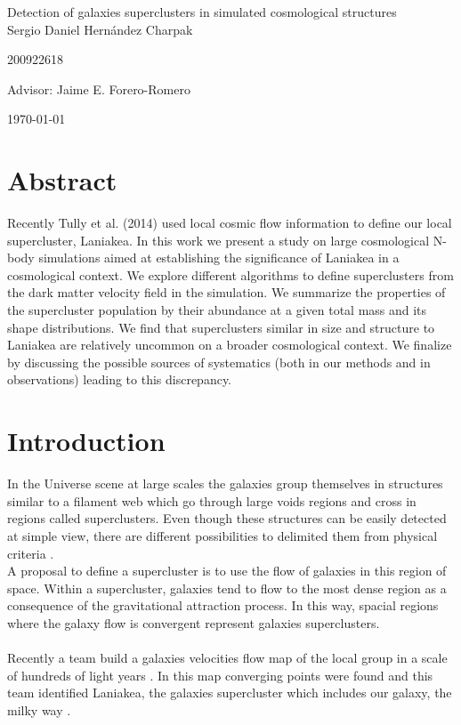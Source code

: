 \documentclass[12pt]{article}
\begin{document}
\begin{center}
\Huge
Detection of galaxies superclusters in simulated cosmological structures\\  
\vspace{3mm}
\Large Sergio Daniel Hern\'{a}ndez Charpak

\large
200922618

\vspace{2mm}
\Large
Advisor: Jaime E. Forero-Romero

\normalsize
\vspace{2mm}

\today
\end{center}


\normalsize
\tableofcontents
\newpage

\section{Abstract}
Recently Tully et al. (2014) \cite{tully_laniakea_2014} used local cosmic flow information to
define our local supercluster, Laniakea. 
In this work we present a study on large cosmological N-body
simulations aimed at establishing the significance of Laniakea in a
cosmological context.
We explore different algorithms to define superclusters from the dark
matter velocity field in the simulation. 
We summarize the properties of the supercluster population by their
abundance at a given total mass and its shape distributions.
We find that superclusters similar in size and structure to Laniakea are
relatively uncommon on a broader cosmological context.
We finalize by discussing the possible sources of systematics (both in
our methods and in observations) leading to this discrepancy.

\section{Introduction}

In the Universe scene at large scales the galaxies group themselves in structures
similar to a filament web which go through large voids regions and cross in regions
called superclusters. Even though these structures can be easily detected at simple
view, there are different possibilities to delimited them from physical criteria \cite{gott_iii_map_2005}.    
\\

A proposal to define a supercluster is to use the flow of galaxies in this region of
space. Within a supercluster, galaxies tend to flow to the most dense region as a
consequence of the gravitational attraction process. In this way, spacial regions where
the galaxy flow is convergent represent galaxies superclusters.\\
\\
Recently a team build a galaxies velocities flow map of the local group in a scale of
hundreds of light years \cite{tully_cosmicflows-2_2013}. In this map converging points
were found and this team identified Laniakea, the galaxies supercluster which includes
our galaxy, the milky way \cite{tully_laniakea_2014}.
\\   
\end{document}
